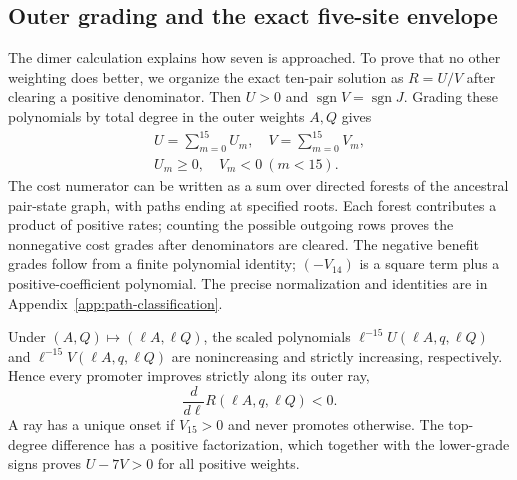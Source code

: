 \documentclass[aps,pre,reprint,amsmath,amssymb,longbibliography]{revtex4-2}
\begin{document}
\subsection{Outer grading and the exact five-site envelope}
\label{sec:v4-p5-grading}
The dimer calculation explains how seven is approached. To prove that
no other weighting does better, we organize the exact ten-pair solution
as $R=U/V$ after clearing a positive denominator. Then $U>0$
and $\operatorname{sgn}V=\operatorname{sgn}J$. Grading these
polynomials by total degree in the outer weights $A,Q$ gives
\begin{equation}
 \begin{gathered}
 U=\sum_{m=0}^{15}U_m,\quad V=\sum_{m=0}^{15}V_m,
 \\
 U_m\ge0,\quad V_m<0\ (m<15).
 \end{gathered}
 \label{eq:v4-p5-grades}
\end{equation}
The cost numerator can be written as a sum over directed forests of
the ancestral pair-state graph, with paths ending at specified roots. Each
forest contributes a product of positive rates; counting the possible
outgoing rows proves the nonnegative cost grades after denominators
are cleared. The negative benefit grades follow from a
finite polynomial identity; $(-V_{14})$ is a square term plus a
positive-coefficient polynomial. The precise
normalization and identities are in Appendix~\ref{app:path-classification}.

Under $(A,Q)\mapsto(\ell A,\ell Q)$, the scaled polynomials
$\ell^{-15}U(\ell A,q,\ell Q)$ and
$\ell^{-15}V(\ell A,q,\ell Q)$ are nonincreasing and strictly
increasing, respectively.
Hence every promoter
improves strictly along its outer ray,
\begin{equation}
 \frac{d}{d\ell}R(\ell A,q,\ell Q)<0.
 \label{eq:v4-p5-ray}
\end{equation}
A ray has a unique onset if $V_{15}>0$ and never promotes otherwise.
The top-degree difference has a positive factorization, which together
with the lower-grade signs proves $U-7V>0$ for all positive weights.
\end{document}
